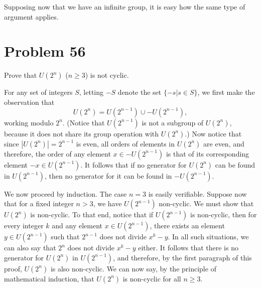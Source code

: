 \documentclass[12pt]{article}
\begin{document}
Supposing now that we have an infinite group, it is easy how the same type
of argument applies.

\section*{Problem 56}

Prove that $U(2^n)$ ($n\geq 3$) is not cyclic.

For any set of integers $S$, letting $-S$ denote the set $\{-s|s\in S\}$,
we first make the observation that
\begin{equation*}
U(2^n)=U(2^{n-1})\cup -U(2^{n-1}),
\end{equation*}
working modulo $2^n$.  (Notice that $U(2^{n-1})$ is not a subgroup of $U(2^n)$, because
it does not share its group operation with $U(2^n)$.)  Now notice that since $|U(2^n)|=2^{n-1}$ is even,
all orders of elements in $U(2^n)$ are even, and therefore,
the order of any element $x\in -U(2^{n-1})$ is that of its corresponding
element $-x\in U(2^{n-1})$.  It follows that if no generator for $U(2^n)$
can be found in $U(2^{n-1})$, then no generator for it can be found in $-U(2^{n-1})$.

We now proceed by induction.  The case $n=3$ is easily verifiable.
Suppose now that for a fixed integer $n>3$, we have $U(2^{n-1})$ non-cyclic.
We must show that $U(2^n)$ is non-cyclic.  To that end, notice that if $U(2^{n-1})$
is non-cyclic, then for every integer $k$ and any element $x\in U(2^{n-1})$, there
exists an element $y\in U(2^{n-1})$ such that $2^{n-1}$ does not divide $x^k-y$.
In all such situations, we can also say that $2^n$ does not divide $x^k-y$ either.
It follows that there is no generator for $U(2^n)$ in $U(2^{n-1})$, and therefore,
by the first paragraph of this proof, $U(2^n)$ is also non-cyclic.
We can now say, by the principle of mathematical induction, that $U(2^n)$ is non-cyclic for all $n\geq 3$.
\end{document}
